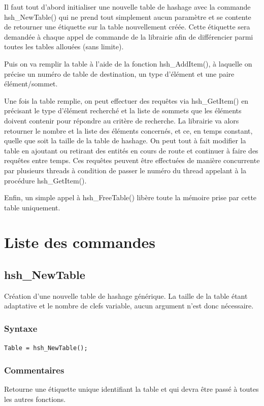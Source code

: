 \documentclass[a4paper,12pt]{article}
\begin{document}
Il faut tout d'abord initialiser une nouvelle table de hashage avec la commande \\
hsh\_NewTable() qui ne prend tout simplement aucun paramètre et se contente de retourner une étiquette sur la table nouvellement créée.
Cette étiquette sera demandée à chaque appel de commande de la librairie afin de différencier parmi toutes les tables allouées (sans limite).

Puis on va remplir la table à l'aide de la fonction hsh\_AddItem(), à laquelle on précise un numéro de table de destination, un type d'élément et une paire élément/sommet.

Une fois la table remplie, on peut effectuer des requêtes via hsh\_GetItem() en précisant le type d'élément recherché et la liste de sommets que les éléments doivent contenir pour répondre au critère de recherche.
La librairie va alors retourner le nombre et la liste des éléments concernés, et ce, en temps constant, quelle que soit la taille de la table de hashage.
On peut tout à fait modifier la table en ajoutant ou retirant des entités en cours de route et continuer à faire des requêtes entre temps.
Ces requêtes peuvent être effectuées de manière concurrente par plusieurs threads à condition de passer le numéro du thread appelant à la procédure hsh\_GetItem().

Enfin, un simple appel à hsh\_FreeTable() libère toute la mémoire prise par cette table uniquement.


%
%

\section{Liste des commandes}


\subsection{hsh\_NewTable}
Création d'une nouvelle table de hashage générique.
La taille de la table étant adaptative et le nombre de clefs variable, aucun argument n'est donc nécessaire.

\subsubsection*{Syntaxe}
{\tt Table = hsh\_NewTable();}

\subsubsection*{Commentaires}
Retourne une étiquette unique identifiant la table et qui devra être passé à toutes les autres fonctions.
\end{document}
